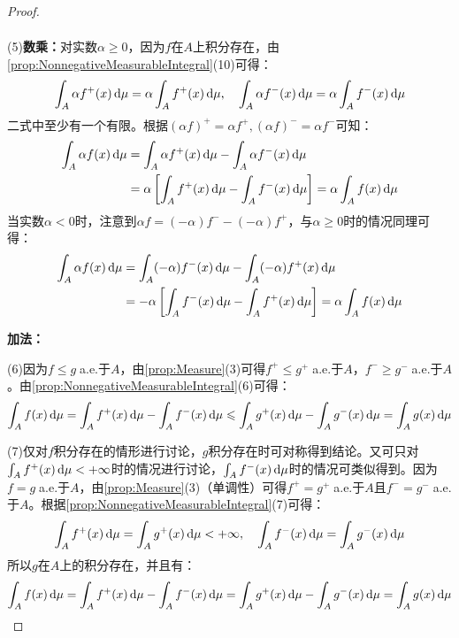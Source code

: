 \begin{proof}
\begin{gather*}
	\end{gather*}\par
	(5)\textbf{数乘：}对实数$\alpha\geqslant0$，因为$f$在$A$上积分存在，由\cref{prop:NonnegativeMeasurableIntegral}(10)可得：
	\begin{equation*}
		\int_{A}\alpha f^+(x)\mathop{}\!\mathrm{d}\mu=\alpha\int_{A}f^+(x)\mathop{}\!\mathrm{d}\mu,\quad\int_{A}\alpha f^-(x)\mathop{}\!\mathrm{d}\mu=\alpha\int_{A}f^-(x)\mathop{}\!\mathrm{d}\mu
	\end{equation*}
	二式中至少有一个有限。根据$(\alpha f)^+=\alpha f^+,(\alpha f)^-=\alpha f^-$可知：
	\begin{align*}
		\int_{A}\alpha f(x)\mathop{}\!\mathrm{d}\mu&=\int_{A}\alpha f^+(x)\mathop{}\!\mathrm{d}\mu-\int_{A}\alpha f^-(x)\mathop{}\!\mathrm{d}\mu \\
		&=\alpha\left[\int_{A}f^+(x)\mathop{}\!\mathrm{d}\mu-\int_{A}f^-(x)\mathop{}\!\mathrm{d}\mu\right]=\alpha\int_{A}f(x)\mathop{}\!\mathrm{d}\mu
	\end{align*}
	当实数$\alpha<0$时，注意到$\alpha f=(-\alpha)f^--(-\alpha)f^+$，与$\alpha\geqslant0$时的情况同理可得：
	\begin{align*}
		\int_{A}\alpha f(x)\mathop{}\!\mathrm{d}\mu&=\int_{A}(-\alpha)f^-(x)\mathop{}\!\mathrm{d}\mu-\int_{A}(-\alpha)f^+(x)\mathop{}\!\mathrm{d}\mu \\
		&=-\alpha\left[\int_{A}f^-(x)\mathop{}\!\mathrm{d}\mu-\int_{A}f^+(x)\mathop{}\!\mathrm{d}\mu\right]=\alpha\int_{A}f(x)\mathop{}\!\mathrm{d}\mu
	\end{align*}\par
	\textbf{加法：}\par
	(6)因为$f\leqslant g\;$a.e.于$A$，由\cref{prop:Measure}(3)可得$f^+\leqslant g^+\;$a.e.于$A$，$f^-\geqslant g^-\;$a.e.于$A$。由\cref{prop:NonnegativeMeasurableIntegral}(6)可得：
	\begin{equation*}
		\int_{A}f(x)\mathop{}\!\mathrm{d}\mu=\int_{A}f^+(x)\mathop{}\!\mathrm{d}\mu-\int_{A}f^-(x)\mathop{}\!\mathrm{d}\mu\leqslant\int_{A}g^+(x)\mathop{}\!\mathrm{d}\mu-\int_{A}g^-(x)\mathop{}\!\mathrm{d}\mu=\int_{A}g(x)\mathop{}\!\mathrm{d}\mu
	\end{equation*}
	\par
	(7)仅对$f$积分存在的情形进行讨论，$g$积分存在时可对称得到结论。又可只对$\int_{A}f^+(x)\mathop{}\!\mathrm{d}\mu<+\infty$时的情况进行讨论，$\int_{A}f^-(x)\mathop{}\!\mathrm{d}\mu$时的情况可类似得到。因为$f=g\;$a.e.于$A$，由\cref{prop:Measure}(3)（单调性）可得$f^+=g^+\;$a.e.于$A$且$f^-=g^-\;$a.e.于$A$。根据\cref{prop:NonnegativeMeasurableIntegral}(7)可得：
	\begin{equation*}
		\int_{A}f^+(x)\mathop{}\!\mathrm{d}\mu=\int_{A}g^+(x)\mathop{}\!\mathrm{d}\mu<+\infty,\quad\int_{A}f^-(x)\mathop{}\!\mathrm{d}\mu=\int_{A}g^-(x)\mathop{}\!\mathrm{d}\mu
	\end{equation*}
	所以$g$在$A$上的积分存在，并且有：
	\begin{equation*}
		\int_{A}f(x)\dif\mu=\int_{A}f^+(x)\dif\mu-\int_{A}f^-(x)\dif\mu=\int_{A}g^+(x)\dif\mu-\int_{A}g^-(x)\dif\mu=\int_{A}g(x)\dif\mu

\end{equation*}
\end{proof}
